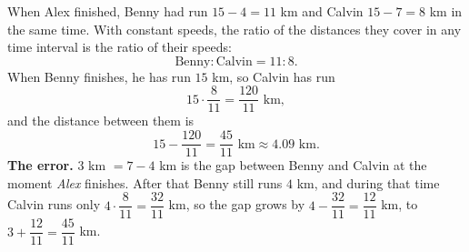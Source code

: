 When Alex finished, Benny had run $15-4=11$ km and Calvin $15-7=8$ km in the same time. With constant speeds, the ratio of the distances they cover in any time interval is the ratio of their speeds:
\[
\text{Benny}:\text{Calvin}=11:8 .
\]
When Benny finishes, he has run $15$ km, so Calvin has run
\[
15\cdot\dfrac{8}{11}=\dfrac{120}{11}\text{ km},
\]
and the distance between them is
\[
15-\dfrac{120}{11}=\boxed{\dfrac{45}{11}\text{ km}}\approx4.09\text{ km}.
\]
\textbf{The error.} $3$ km $=7-4$ km is the gap between Benny and Calvin at the moment \emph{Alex} finishes. After that Benny still runs $4$ km, and during that time Calvin runs only $4\cdot\dfrac{8}{11}=\dfrac{32}{11}$ km, so the gap grows by $4-\dfrac{32}{11}=\dfrac{12}{11}$ km, to $3+\dfrac{12}{11}=\dfrac{45}{11}$ km.

